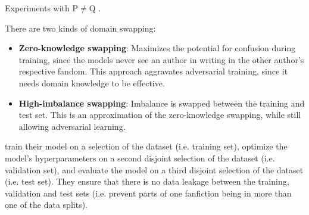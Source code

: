 \begin{definition}
    Experiments with P$\neq$Q \cite{bischoff_importance_2020}.
    \begin{table}[]
        \centering
        \caption{Domain-swapping scheme $S_2$ for \ac{aa} problem instances, where A, B, are authors and P, Q domains and 
        the vertical mapping denotes which author has written in which domain. 
        For training, texts from A and B take turn; for testing, previously unseen texts from A and B are used \cite{bischoff_importance_2020}.}
        \label{tab:within_domain_aa}
    \end{table}
    There are two kinds of domain swapping:
    \begin{itemize}
        \item \textbf{Zero-knowledge swapping}: Maximizes the potential for confusion during training, 
        since the models never see an author in writing in the other author's respective fandom.
        This approach aggravates adversarial training, since it needs domain knowledge to be effective.
        \item \textbf{High-imbalance swapping}: Imbalance is swapped between the training and test set. 
        This is an approximation of the zero-knowledge swapping, while still allowing adversarial learning.
    \end{itemize}
\end{definition}

\begin{definition}
    \citet{bischoff_importance_2020} train their model on a selection of the dataset (i.e. training set), 
    optimize the model's hyperparameters on a second disjoint selection of the dataset (i.e. validation set),
    and evaluate the model on a third disjoint selection of the dataset (i.e. test set).
    They ensure that there is no data leakage between the training, validation and test sets 
    (i.e. prevent parts of one fanfiction being in more than one of the data splits).
\end{definition}